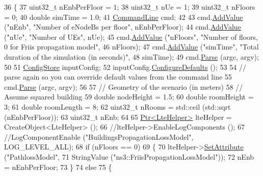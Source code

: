\begin{DoxyCode}
36 \{
37   uint32\_t nEnbPerFloor = 1;
38   uint32\_t nUe = 1;
39   uint32\_t nFloors = 0;
40   \textcolor{keywordtype}{double} simTime = 1.0;
41   \hyperlink{classns3_1_1CommandLine}{CommandLine} cmd;
42 
43   cmd.\hyperlink{classns3_1_1CommandLine_addcfb546c7ad4c8bd0965654d55beb8e}{AddValue} (\textcolor{stringliteral}{"nEnb"}, \textcolor{stringliteral}{"Number of eNodeBs per floor"}, nEnbPerFloor);
44   cmd.\hyperlink{classns3_1_1CommandLine_addcfb546c7ad4c8bd0965654d55beb8e}{AddValue} (\textcolor{stringliteral}{"nUe"}, \textcolor{stringliteral}{"Number of UEs"}, nUe);
45   cmd.\hyperlink{classns3_1_1CommandLine_addcfb546c7ad4c8bd0965654d55beb8e}{AddValue} (\textcolor{stringliteral}{"nFloors"}, \textcolor{stringliteral}{"Number of floors, 0 for Friis propagation model"},
46                 nFloors);
47   cmd.\hyperlink{classns3_1_1CommandLine_addcfb546c7ad4c8bd0965654d55beb8e}{AddValue} (\textcolor{stringliteral}{"simTime"}, \textcolor{stringliteral}{"Total duration of the simulation (in seconds)"},
48                 simTime);
49   cmd.\hyperlink{classns3_1_1CommandLine_a5c10b85b3207e5ecb48d907966923156}{Parse} (argc, argv);
50 
51   \hyperlink{classns3_1_1ConfigStore}{ConfigStore} inputConfig;
52   inputConfig.\hyperlink{classns3_1_1ConfigStore_a0a6137574d7c847c3823af8b9d1bb886}{ConfigureDefaults} ();
53 
54   \textcolor{comment}{// parse again so you can override default values from the command line}
55   cmd.\hyperlink{classns3_1_1CommandLine_a5c10b85b3207e5ecb48d907966923156}{Parse} (argc, argv);
56 
57   \textcolor{comment}{// Geometry of the scenario (in meters)}
58   \textcolor{comment}{// Assume squared building}
59   \textcolor{keywordtype}{double} nodeHeight = 1.5;
60   \textcolor{keywordtype}{double} roomHeight = 3;
61   \textcolor{keywordtype}{double} roomLength = 8;
62   uint32\_t nRooms = std::ceil (std::sqrt (nEnbPerFloor));
63   uint32\_t nEnb;
64 
65   \hyperlink{classns3_1_1Ptr}{Ptr<LteHelper>} lteHelper = CreateObject<LteHelper> ();
66   \textcolor{comment}{//lteHelper->EnableLogComponents ();}
67   \textcolor{comment}{//LogComponentEnable ("BuildingsPropagationLossModel", LOG\_LEVEL\_ALL);}
68   \textcolor{keywordflow}{if} (nFloors == 0)
69     \{
70       lteHelper->\hyperlink{classns3_1_1ObjectBase_ac60245d3ea4123bbc9b1d391f1f6592f}{SetAttribute} (\textcolor{stringliteral}{"PathlossModel"},
71                                StringValue (\textcolor{stringliteral}{"ns3::FriisPropagationLossModel"}));
72       nEnb = nEnbPerFloor;
73     \}
74   \textcolor{keywordflow}{else}
75     \{

\end{DoxyCode}
